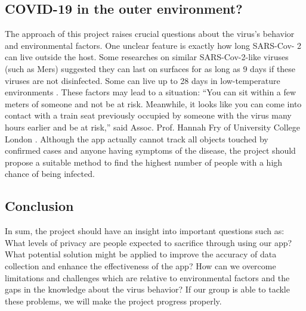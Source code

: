   \subsection{COVID-19 in the outer environment?}
    \par The approach of this project raises crucial questions about the virus’s behavior and environmental factors. One unclear feature is exactly how long SARS-Cov- 2 can live outside the host. Some researches on similar SARS-Cov-2-like viruses (such as Mers) suggested they can last on surfaces for as long as 9 days if these viruses are not disinfected. Some can live up to 28 days in low-temperature environments \parencite{Questions3}. These factors may lead to a situation: “You can sit within a few meters of someone and not be at risk. Meanwhile, it looks like you can come into contact with a train seat previously occupied by someone with the virus many hours earlier and be at risk,” said Assoc. Prof. Hannah Fry of University College London \parencite{Questions4}. Although the app actually cannot track all objects touched by confirmed cases and anyone having symptoms of the disease, the project should propose a suitable method to find the highest number of people with a high chance of being infected.
  \subsection{Conclusion}
    \par In sum, the project should have an insight into important questions such as: What levels of privacy are people expected to sacrifice through using our app? What potential solution might be applied to improve the accuracy of data collection and enhance the effectiveness of the app? How can we overcome limitations and challenges which are relative to environmental factors and the gaps in the knowledge about the virus behavior? If our group is able to tackle these problems, we will make the project progress properly.


